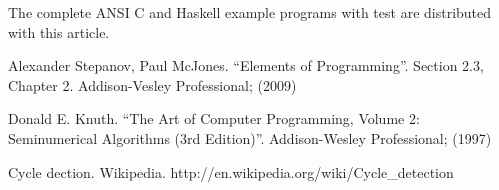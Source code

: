\documentclass{article}
\begin{document}
The complete ANSI C and Haskell example programs with test are distributed with this article.

\begin{thebibliography}{99}

Alexander Stepanov, Paul McJones. ``Elements of Programming''. Section 2.3, Chapter 2. Addison-Vesley Professional; (2009)

Donald E. Knuth. ``The Art of Computer Programming, Volume 2: Seminumerical Algorithms (3rd Edition)''. Addison-Wesley Professional; (1997)

Cycle dection. Wikipedia. http://en.wikipedia.org/wiki/Cycle\_detection

\end{thebibliography}
\end{document}
